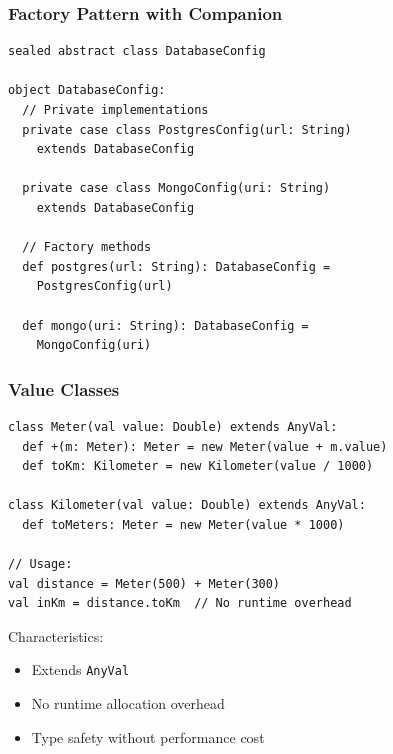 \documentclass{beamer}
\begin{document}
\begin{frame}[fragile]
\frametitle{Factory Pattern with Companion}
\begin{lstlisting}[style=scala]
sealed abstract class DatabaseConfig

object DatabaseConfig:
  // Private implementations
  private case class PostgresConfig(url: String) 
    extends DatabaseConfig
    
  private case class MongoConfig(uri: String) 
    extends DatabaseConfig

  // Factory methods
  def postgres(url: String): DatabaseConfig = 
    PostgresConfig(url)
    
  def mongo(uri: String): DatabaseConfig = 
    MongoConfig(uri)
\end{lstlisting}
\end{frame}

\begin{frame}[fragile]
\frametitle{Value Classes}
\begin{lstlisting}[style=scala]
class Meter(val value: Double) extends AnyVal:
  def +(m: Meter): Meter = new Meter(value + m.value)
  def toKm: Kilometer = new Kilometer(value / 1000)

class Kilometer(val value: Double) extends AnyVal:
  def toMeters: Meter = new Meter(value * 1000)

// Usage:
val distance = Meter(500) + Meter(300)
val inKm = distance.toKm  // No runtime overhead
\end{lstlisting}

Characteristics:
\begin{itemize}
\item Extends \texttt{AnyVal}
\item No runtime allocation overhead
\item Type safety without performance cost
\end{itemize}
\end{frame}
\end{document}
